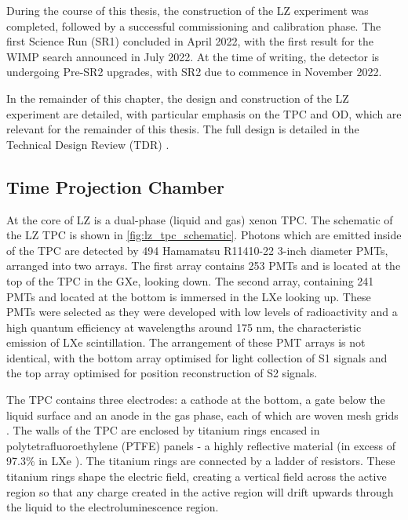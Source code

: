 \par
During the course of this thesis, the construction of the LZ experiment was completed, followed by a successful commissioning and calibration phase.
The first Science Run (SR1) concluded in April 2022, with the first result for the WIMP search announced in July 2022.
At the time of writing, the detector is undergoing Pre-SR2 upgrades, with SR2 due to commence in November 2022.

\par
In the remainder of this chapter, the design and construction of the LZ experiment are detailed, with particular emphasis on the TPC and OD, which are relevant for the remainder of this thesis. 
The full design is detailed in the Technical Design Review (TDR) \cite{LZ_TechnicalDesignReview_ref}.

\subsection{Time Projection Chamber}
\label{sec:lz_tpc}
\par
At the core of LZ is a dual-phase (liquid and gas) xenon TPC.
The schematic of the LZ TPC is shown in \autoref{fig:lz_tpc_schematic}.
Photons which are emitted inside of the TPC are detected by 494 Hamamatsu R11410-22 3-inch diameter PMTs, arranged into two arrays.
The first array contains 253 PMTs and is located at the top of the TPC in the GXe, looking down.
The second array, containing 241 PMTs and located at the bottom is immersed in the LXe looking up.
These PMTs were selected as they were developed with low levels of radioactivity and a high quantum efficiency at wavelengths around 175 nm, the characteristic emission of LXe scintillation.
The arrangement of these PMT arrays is not identical, with the bottom array optimised for light collection of S1 signals and the top array optimised for position reconstruction of S2 signals.
\par
The TPC contains three electrodes: a cathode at the bottom, a gate below the liquid surface and an anode in the gas phase, each of which are woven mesh grids \cite{lz_grids_ref}.
The walls of the TPC are enclosed by titanium rings encased in polytetrafluoroethylene (PTFE) panels - a highly reflective material (in excess of 97.3\% in LXe \cite{ptfe_lxe_reflectivity_ref}).
The titanium rings are connected by a ladder of resistors.
These titanium rings shape the electric field, creating a vertical field across the active region so that any charge created in the active region will drift upwards through the liquid to the electroluminescence region.
